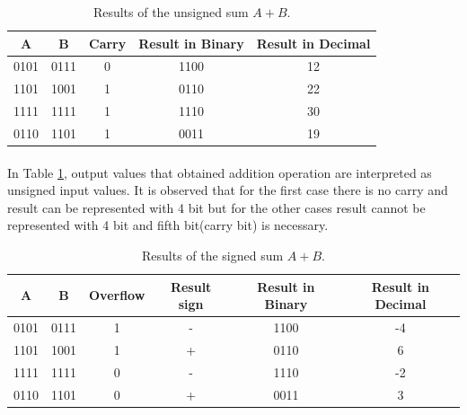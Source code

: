\documentclass[pdftex,12pt,a4paper]{article}
\begin{document}
\begin{flushleft}
\begin{table}[!h]
\begin{center}
    \begin{tabular}{|c|c|c|c|c|}
    \hline
         A & B & Carry & Result in Binary & Result in Decimal \\
         \hline
         0101 & 0111 & 0 & 1100 & 12 \\
         \hline
         1101 & 1001 & 1 & 0110 & 22  \\
         \hline
         1111 & 1111 & 1 & 1110 & 30 \\
         \hline
         0110 & 1101 & 1 & 0011 & 19 \\
         \hline
        \end{tabular}
    \caption{Results of the unsigned sum $A + B$.}
    \label{unsigned_sum}
\end{center}
\end{table}


\paragraph{}
In Table \ref{unsigned_sum}, output values that obtained addition operation are interpreted as unsigned input values. It is observed that for the first case there is no carry and result can be represented with 4 bit but for the other cases result cannot be represented with 4 bit and fifth bit(carry bit) is necessary.

\begin{table}[!h]
\begin{center}
    \begin{tabular}{|c|c|c|c|c|c|}
    \hline
         A & B & Overflow & Result sign & Result in Binary & Result in Decimal \\
         \hline
         0101 & 0111 & 1 & - & 1100 & -4 \\
         \hline
         1101 & 1001 & 1 & + & 0110 & 6 \\
         \hline
         1111 & 1111 & 0 & - & 1110 & -2 \\
         \hline
         0110 & 1101 & 0 & + & 0011 & 3 \\
         \hline
        \end{tabular}
    \caption{Results of the signed sum $A + B$.}
    \label{signed_sum}
\end{center}
\end{table}


\end{flushleft}
\end{document}
